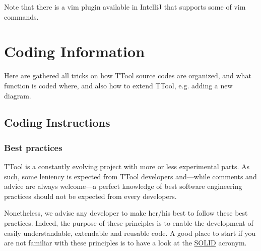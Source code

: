 \documentclass[12pt]{article}
\begin{document}
Note that there is a vim plugin available in IntelliJ that supports some of vim
commands.

\newpage 

\section{Coding Information}
Here are gathered all tricks on how TTool source codes are organized, and what function is coded where, and also how to extend TTool, e.g. adding a new diagram.

\subsection{Coding Instructions}
\label{sec:code_info}
\subsubsection{Best practices}

TTool is a constantly evolving project with more or less experimental parts. As
such, some leniency is expected from TTool developers and---while comments and
advice are always welcome---a perfect knowledge of best software engineering
practices should not be expected from every developers.

Nonetheless, we advise any developer to make her/his best to follow these best
practices. Indeed, the purpose of these principles is to enable the development
of easily understandable, extendable and reusable code. A good place to start if
you are not familiar with these principles is to have a look at the
\href{https://en.wikipedia.org/wiki/SOLID_(object-oriented_design)}{SOLID}
acronym.
\end{document}
